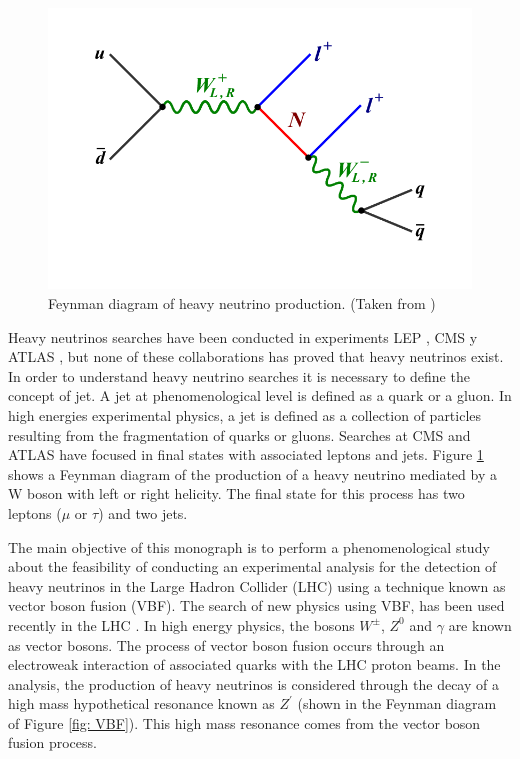 \documentclass[12pt]{article}
\begin{document}
\begin{figure}[H]
\centering
\includegraphics[width=\linewidth]{Figures/Feynman_W.png}
\caption{Feynman diagram of heavy neutrino production. (Taken from \cite{CMS ATLAS})}
\label{fig: W}
\end{figure}

Heavy neutrinos searches have been conducted in experiments LEP \cite{LEP}, CMS y ATLAS \cite{CMS ATLAS}, but none of these collaborations has proved that heavy neutrinos exist. In order to understand heavy neutrino searches it is necessary to define the concept of jet. A jet at phenomenological level is defined as a quark or a gluon. In high energies experimental physics, a jet is defined as a collection of particles resulting from the fragmentation of quarks or gluons. Searches at CMS and ATLAS have focused in final states with associated leptons and jets. Figure \ref{fig: W} shows a Feynman diagram of the production of a heavy neutrino mediated by a W boson with left or right helicity. The final state for this process has two leptons ($\mu$ or $\tau$) and two jets.

The main objective of this monograph is to perform a phenomenological study about the feasibility of conducting an experimental analysis for the detection of heavy neutrinos in the Large Hadron Collider (LHC) using a technique known as vector boson fusion (VBF). The search of new physics using VBF, has been used recently in the LHC \cite{VBF Search}. In high energy physics, the bosons $W^{\pm}$, $Z^{0}$ and $\gamma$ are known as vector bosons. The process of vector boson fusion occurs through an electroweak interaction of associated quarks with the LHC proton beams. In the analysis, the production of heavy neutrinos is considered through the decay of a high mass hypothetical resonance known as $Z^{'}$ (shown in the Feynman diagram of Figure \ref{fig: VBF}). This high mass resonance comes from the vector boson fusion process.  
\end{document}
